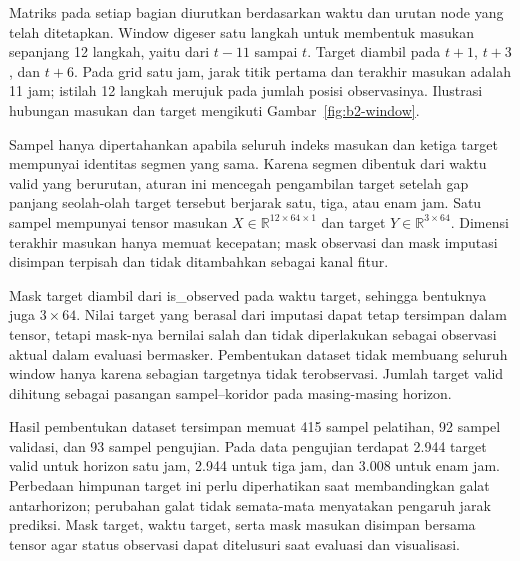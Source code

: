 Matriks pada setiap bagian diurutkan berdasarkan waktu dan urutan node yang telah ditetapkan. Window digeser satu langkah untuk membentuk masukan sepanjang 12 langkah, yaitu dari $t-11$ sampai $t$. Target diambil pada $t+1$, $t+3$, dan $t+6$. Pada grid satu jam, jarak titik pertama dan terakhir masukan adalah 11 jam; istilah 12 langkah merujuk pada jumlah posisi observasinya. Ilustrasi hubungan masukan dan target mengikuti Gambar~\ref{fig:b2-window}.

Sampel hanya dipertahankan apabila seluruh indeks masukan dan ketiga target mempunyai identitas segmen yang sama. Karena segmen dibentuk dari waktu valid yang berurutan, aturan ini mencegah pengambilan target setelah gap panjang seolah-olah target tersebut berjarak satu, tiga, atau enam jam. Satu sampel mempunyai tensor masukan $X\in\mathbb{R}^{12\times64\times1}$ dan target $Y\in\mathbb{R}^{3\times64}$. Dimensi terakhir masukan hanya memuat kecepatan; mask observasi dan mask imputasi disimpan terpisah dan tidak ditambahkan sebagai kanal fitur.

Mask target diambil dari is\_observed pada waktu target, sehingga bentuknya juga $3\times64$. Nilai target yang berasal dari imputasi dapat tetap tersimpan dalam tensor, tetapi mask-nya bernilai salah dan tidak diperlakukan sebagai observasi aktual dalam evaluasi bermasker. Pembentukan dataset tidak membuang seluruh window hanya karena sebagian targetnya tidak terobservasi. Jumlah target valid dihitung sebagai pasangan sampel--koridor pada masing-masing horizon.

Hasil pembentukan dataset tersimpan memuat 415 sampel pelatihan, 92 sampel validasi, dan 93 sampel pengujian. Pada data pengujian terdapat 2.944 target valid untuk horizon satu jam, 2.944 untuk tiga jam, dan 3.008 untuk enam jam. Perbedaan himpunan target ini perlu diperhatikan saat membandingkan galat antarhorizon; perubahan galat tidak semata-mata menyatakan pengaruh jarak prediksi. Mask target, waktu target, serta mask masukan disimpan bersama tensor agar status observasi dapat ditelusuri saat evaluasi dan visualisasi.
